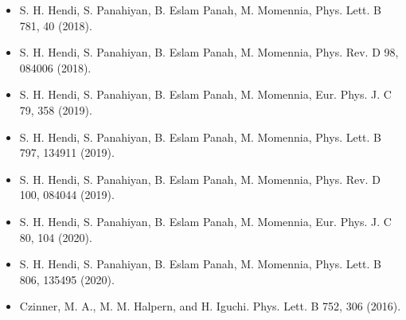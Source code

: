 \documentclass[12pt]{article}
\begin{document}
\begin{itemize}
    \item S. H. Hendi, S. Panahiyan, B. Eslam Panah, M. Momennia, Phys. Lett. B 781, 40 (2018).
    \item S. H. Hendi, S. Panahiyan, B. Eslam Panah, M. Momennia, Phys. Rev. D 98, 084006 (2018).
    \item S. H. Hendi, S. Panahiyan, B. Eslam Panah, M. Momennia, Eur. Phys. J. C 79, 358 (2019).
    \item S. H. Hendi, S. Panahiyan, B. Eslam Panah, M. Momennia, Phys. Lett. B 797, 134911 (2019).
    \item S. H. Hendi, S. Panahiyan, B. Eslam Panah, M. Momennia, Phys. Rev. D 100, 084044 (2019).
    \item S. H. Hendi, S. Panahiyan, B. Eslam Panah, M. Momennia, Eur. Phys. J. C 80, 104 (2020).
    \item S. H. Hendi, S. Panahiyan, B. Eslam Panah, M. Momennia, Phys. Lett. B 806, 135495 (2020).
    \item Czinner, M. A., M. M. Halpern, and H. Iguchi. Phys. Lett. B 752, 306 (2016).
\end{itemize}
\end{document}
